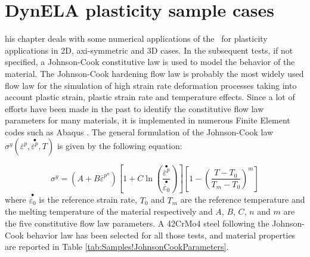 %
%
%
\chapter{DynELA plasticity sample cases}

\startcontents[chapters]
\printmyminitoc[1]his chapter deals with some numerical applications of
the \DynELA~for plasticity applications in 2D, axi-symmetric and
3D cases. In the subsequent tests, if not specified, a Johnson-Cook
constitutive law is used to model the behavior of the material. The
Johnson-Cook hardening flow law is probably the most widely used flow
law for the simulation of high strain rate deformation processes taking
into account plastic strain, plastic strain rate and temperature effects.
Since a lot of efforts have been made in the past to identify the
constitutive flow law parameters for many materials, it is implemented
in numerous Finite Element codes such as Abaqus \cite{abaqus20146}.
The general formulation of the Johnson-Cook law $\sigma^{y}(\overline{\varepsilon}^{p},\stackrel{\bullet}{\overline{\varepsilon}^{p}},T)$
is given by the following equation:

\begin{equation}
\sigma^{y}=\left(A+B\overline{\varepsilon}^{p^{n}}\right)\left[1+C\ln\left(\frac{\stackrel{\bullet}{\overline{\varepsilon}^{p}}}{\stackrel{\bullet}{\overline{\varepsilon}_{0}}}\right)\right]\left[1-\left(\frac{T-T_{0}}{T_{m}-T_{0}}\right)^{m}\right]\label{eq:Samples!Johnson-Cook}
\end{equation}
where $\stackrel{\bullet}{\overline{\varepsilon}_{0}}$ is the reference
strain rate, $T_{0}$ and $T_{m}$ are the reference temperature and
the melting temperature of the material respectively and $A$, $B$,
$C$, $n$ and $m$ are the five constitutive flow law parameters.
A 42CrMo4 steel following the Johnson-Cook behavior law has been selected
for all those tests, and material properties are reported in Table
\ref{tab:Samples!JohnsonCookParameters}.


